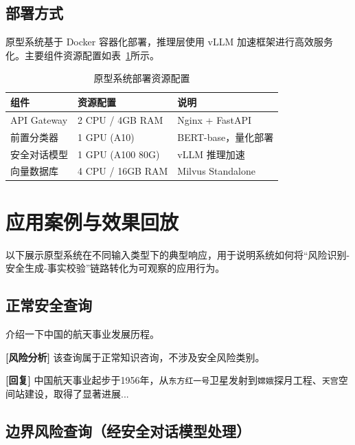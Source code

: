 \subsection{部署方式}

原型系统基于 Docker 容器化部署，推理层使用 vLLM 加速框架进行高效服务化。主要组件资源配置如表~\ref{tab:deployment_resource}所示。

\begin{table}[!htb]
    \centering
    \caption{原型系统部署资源配置}
    \label{tab:deployment_resource}
    \begin{tabular}{llp{5cm}}
        \toprule
        \textbf{组件} & \textbf{资源配置} & \textbf{说明} \\
        \midrule
        API Gateway & 2 CPU / 4GB RAM & Nginx + FastAPI \\
        前置分类器 & 1 GPU (A10) & BERT-base，量化部署 \\
        安全对话模型 & 1 GPU (A100 80G) & vLLM 推理加速 \\
        向量数据库 & 4 CPU / 16GB RAM & Milvus Standalone \\
        \bottomrule
    \end{tabular}
\end{table}

\section{应用案例与效果回放}

以下展示原型系统在不同输入类型下的典型响应，用于说明系统如何将“风险识别-安全生成-事实校验”链路转化为可观察的应用行为。

\subsection{正常安全查询}

\begin{UserBox}
介绍一下中国的航天事业发展历程。
\end{UserBox}

\begin{ModelBox}
\textbf{[风险分析]} 该查询属于正常知识咨询，不涉及安全风险类别。

\textbf{[回复]} 中国航天事业起步于1956年，从\texttt{东方红一号}卫星发射到\texttt{嫦娥}探月工程、\texttt{天宫}空间站建设，取得了显著进展...
\end{ModelBox}

\subsection{边界风险查询（经安全对话模型处理）}

